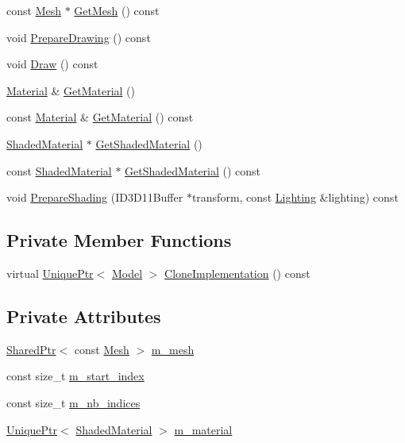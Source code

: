 \begin{DoxyCompactItemize}
const \hyperlink{classmage_1_1_mesh}{Mesh} $\ast$ \hyperlink{classmage_1_1_model_a085c12b33ebe60e7576c643e2d47baf0}{Get\+Mesh} () const
\item 
void \hyperlink{classmage_1_1_model_a0083c64e8199db23b78a9281be84685f}{Prepare\+Drawing} () const
\item 
void \hyperlink{classmage_1_1_model_a13badcd5e7bfaf8fbdc447dc211d5ad9}{Draw} () const
\item 
\hyperlink{structmage_1_1_material}{Material} \& \hyperlink{classmage_1_1_model_ae2d9b0fee188fe8f0377872bc2f8c2f6}{Get\+Material} ()
\item 
const \hyperlink{structmage_1_1_material}{Material} \& \hyperlink{classmage_1_1_model_aedb16dfea55edaefc3e5d88e9f9fa756}{Get\+Material} () const
\item 
\hyperlink{structmage_1_1_shaded_material}{Shaded\+Material} $\ast$ \hyperlink{classmage_1_1_model_af709f5b1ec136cbab25bda39e20e1662}{Get\+Shaded\+Material} ()
\item 
const \hyperlink{structmage_1_1_shaded_material}{Shaded\+Material} $\ast$ \hyperlink{classmage_1_1_model_a84af7ad13b2bc1d8a51828a62fbaa4b0}{Get\+Shaded\+Material} () const
\item 
void \hyperlink{classmage_1_1_model_a14cc836651dc3eeb378d749b24c149d9}{Prepare\+Shading} (I\+D3\+D11\+Buffer $\ast$transform, const \hyperlink{structmage_1_1_lighting}{Lighting} \&lighting) const
\end{DoxyCompactItemize}
\subsection*{Private Member Functions}
\begin{DoxyCompactItemize}
\item 
virtual \hyperlink{namespacemage_a8c307fbcc33bce9b7f2aa4c26c3b95cf}{Unique\+Ptr}$<$ \hyperlink{classmage_1_1_model}{Model} $>$ \hyperlink{classmage_1_1_model_a4e32ba81c5305dd23dfe760765a5b7d2}{Clone\+Implementation} () const
\end{DoxyCompactItemize}
\subsection*{Private Attributes}
\begin{DoxyCompactItemize}
\item 
\hyperlink{namespacemage_a1e01ae66713838a7a67d30e44c67703e}{Shared\+Ptr}$<$ const \hyperlink{classmage_1_1_mesh}{Mesh} $>$ \hyperlink{classmage_1_1_model_aecd2b4031c5df30fb5f7ed6d62810f73}{m\+\_\+mesh}
\item 
const size\+\_\+t \hyperlink{classmage_1_1_model_a63a3e697c9eb1606249de15cc7b818c3}{m\+\_\+start\+\_\+index}
\item 
const size\+\_\+t \hyperlink{classmage_1_1_model_a1fcf80ed9f3002bd2319ef83f073ae75}{m\+\_\+nb\+\_\+indices}
\item 
\hyperlink{namespacemage_a8c307fbcc33bce9b7f2aa4c26c3b95cf}{Unique\+Ptr}$<$ \hyperlink{structmage_1_1_shaded_material}{Shaded\+Material} $>$ \hyperlink{classmage_1_1_model_a93e080e5dc2c7c0672a278de76899122}{m\+\_\+material}
\end{DoxyCompactItemize}


